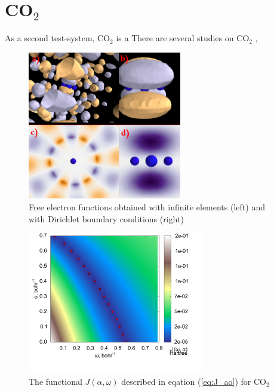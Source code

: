 \section{CO$_2$}
As a second test-system, CO$_2$ is a
There are several studies on CO$_2$ \cite{CO2, CO2_highres, HighResLinear, DiffLinear},
\begin{figure}
\includegraphics[width=0.6\textwidth]{Figures/CO2/Solutions}
\caption{Free electron functions obtained with infinite elements (left) and with Dirichlet boundary conditions (right)}
\label{fig:CO2_exs}
\end{figure}

\begin{figure}
\includegraphics[width=0.69\textwidth]{Figures/CO2_J0_2D_terrain}
\caption{The functional $J(\alpha,\omega)$ described in eqation (\ref{eq:J_ao}) for CO$_2$}
\label{fig:CO2-otrsh}
\end{figure}

